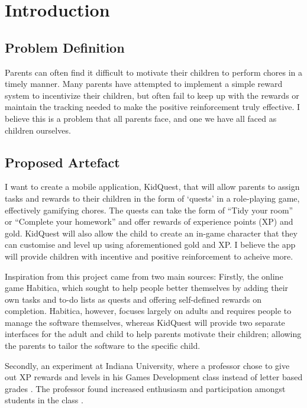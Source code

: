 \chapter{Introduction}
\label{chap:intro}

\section{Problem Definition}
Parents can often find it difficult to motivate their children to perform chores in a timely manner. 
Many parents have attempted to implement a simple reward system to incentivize their children, but often fail to keep up with the rewards or maintain the tracking needed to make the positive reinforcement truly effective.
I believe this is a problem that all parents face, and one we have all faced as children ourselves.  

\section{Proposed Artefact}
I want to create a mobile application, KidQuest, that will allow parents to assign tasks and rewards to their children in the form of `quests' in a role-playing game, effectively gamifying chores. 
The quests can take the form of ``Tidy your room'' or ``Complete your homework'' and offer rewards of experience points (XP) and gold. KidQuest will also allow the child to create an in-game character that they can customise and level up using aforementioned gold and XP.
I believe the app will provide children with incentive and positive reinforcement to acheive more.

Inspiration from this project came from two main sources: Firstly, the online game Habitica, which sought to help people better themselves by adding their own tasks and to-do lists as quests and offering self-defined rewards on completion. 
Habitica, however, focuses largely on adults and requires people to manage the software themselves, whereas KidQuest will provide two separate interfaces for the adult and child to help parents motivate their children; allowing the parents to tailor the software to the specific child.

Secondly, an experiment at Indiana University, where a professor chose to give out XP rewards and levels in his Games Development class instead of letter based grades \cite{sheldon2011multiplayer}.  
The professor found increased enthusiasm and participation amongst students in the class \cite{sheldonclasspostmortem}.

